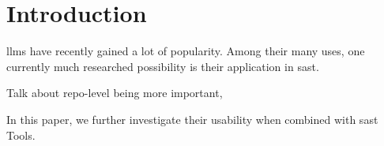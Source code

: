 \section{Introduction}
\label{sec:intro}
\acp{llm} have recently gained a lot of popularity.
Among their many uses, one currently much researched possibility is their application in \ac{sast}.

Talk about repo-level being more important, \cite{risse2024scorewrongexambenchmarking} 

In this paper, we further investigate their usability when combined with \ac{sast} Tools.